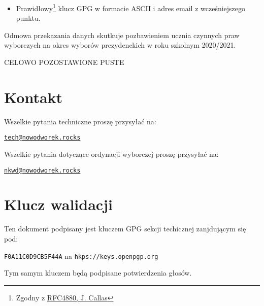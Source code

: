 \begin{itemize}
  \item Prawidłowy\footnote{Zgodny z \href{https://tools.ietf.org/html/rfc4880}{RFC4880, J. Callas}} klucz GPG w formacie ASCII i adres email z wcześniejszego punktu.
\end{itemize}
\vspace{0.3cm} %

Odmowa przekazania danych skutkuje pozbawieniem ucznia czynnych praw wyborczych na okres wyborów prezydenckich w roku szkolnym 2020/2021.

\vfill
\begin{center}
\normalsize \textcolor{white!30!black}{CELOWO POZOSTAWIONE PUSTE}\end{center}
\vfill

\newpage

\vspace{3cm}
\appendix
\section*{}

\section{Kontakt}

Wszelkie pytania techniczne proszę przysyłać na:
\begin{center}\href{mailto:tech@nowodworek.rocks}{\texttt{tech@nowodworek.rocks}}\end{center}
Wszelkie pytania dotyczące ordynacji wyborczej proszę przysyłać na:
\begin{center}\href{mailto:nkwd@nowodworek.rocks}{\texttt{nkwd@nowodworek.rocks}}\end{center}

\section{Klucz walidacji}

Ten dokument podpisany jest kluczem GPG sekcji techicznej zanjdującym się pod:
\begin{center}\texttt{F0A11C0D9CB5F44A} na \texttt{hkps://keys.openpgp.org}\\ \end{center}
\noindent Tym samym kluczem będą podpisane potwierdzenia głosów.

